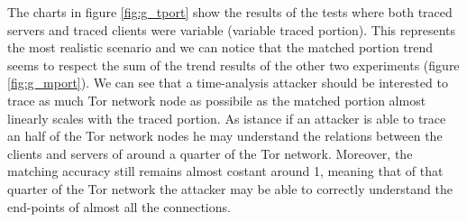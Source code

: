 The charts in figure \ref{fig:g_tport} show the results of the
tests where both traced servers and traced clients were variable
(variable traced portion). This
represents the most realistic scenario and we can notice that the
matched portion trend seems to respect the sum of the trend results of the other
two experiments (figure \ref{fig:g_mport}). We can see that a
time-analysis attacker should be interested to trace as much Tor
network node as possibile as the matched portion almost
linearly scales with the traced portion. As istance if an attacker is
able to trace an half of the Tor network nodes he may understand the
relations between the clients and servers of around a quarter of the Tor
network. Moreover, the matching accuracy still remains almost costant
around 1, meaning that of that quarter of the Tor network the attacker
may be able to correctly understand the end-points of almost all the connections.



